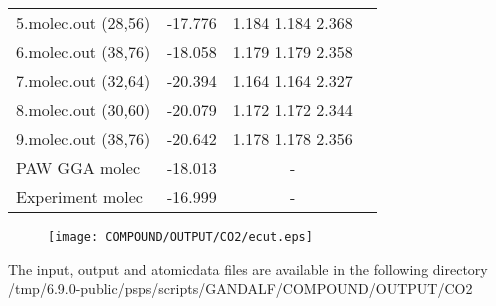 \documentclass[onecolumn]{revtex4}
\begin{document}
\begin{center}
\begin{tabular}{lccccc}
5.molec.out (28,56)&\multicolumn{2}{c}{-17.776}&\multicolumn{2}{c}{1.184 1.184 2.368 } \\ 
6.molec.out (38,76)&\multicolumn{2}{c}{-18.058}&\multicolumn{2}{c}{1.179 1.179 2.358 } \\ 
7.molec.out (32,64)&\multicolumn{2}{c}{-20.394}&\multicolumn{2}{c}{1.164 1.164 2.327 } \\ 
8.molec.out (30,60)&\multicolumn{2}{c}{-20.079}&\multicolumn{2}{c}{1.172 1.172 2.344 } \\ 
9.molec.out (38,76)&\multicolumn{2}{c}{-20.642}&\multicolumn{2}{c}{1.178 1.178 2.356 } \\ 
PAW GGA molec~\cite{Paier_JCP122_2005} & \multicolumn{2}{c}{-18.013} & \multicolumn{2}{c}{-} \\ %
Experiment molec~\cite{Paier_JCP122_2005} & \multicolumn{2}{c}{-16.999} & \multicolumn{2}{c}{-} \\ %
\hline
\hline
\end{tabular}
\end{center}
\begin{figure}[h] 
\centering 
\texttt{[image: COMPOUND/OUTPUT/CO2/ecut.eps]}
\end{figure}
\begin{htmlonly} 
The input, output and atomicdata files are available in the following directory 
  {/tmp/6.9.0-public/psps/scripts/GANDALF/COMPOUND/OUTPUT/CO2} 
\end{htmlonly} 
\newpage
\end{document}
